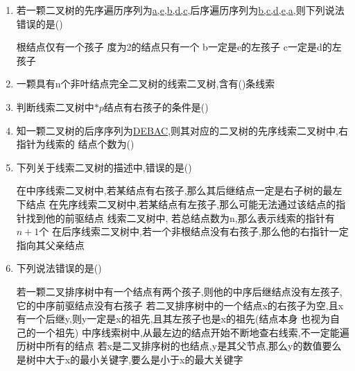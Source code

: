 \documentclass[12pt, a4paper, oneside, UTF8]{ctexbook}
\begin{document}
\begin{enumerate}
    \item 若一颗二叉树的先序遍历序列为\underline{a,e,b,d,c},后序遍历序列为\underline{b,c,d,e,a},则下列说法错误的是(\qquad)
    \begin{choices}[2]
        \task 根结点仅有一个孩子
        \task 度为2的结点只有一个
        \task b一定是e的左孩子
        \task c一定是d的左孩子
    \end{choices}
    \item 一颗具有n个非叶结点完全二叉树的线索二叉树,含有(\qquad)条线索
    \item 判断线索二叉树中$*p$结点有右孩子的条件是(\qquad\qquad)
    \item 知一颗二叉树的后序序列为\underline{DEBAC},则其对应的二叉树的先序线索二叉树中,右指针为线索的
    结点个数为(\qquad)
    \item 下列关于线索二叉树的描述中,错误的是(\qquad)
    \begin{choices}[1]
        \task 在中序线索二叉树中,若某结点有右孩子,那么其后继结点一定是右子树的最左下结点
        \task 在先序线索二叉树中,若某结点有左孩子,那么可能无法通过该结点的指针找到他的前驱结点
        \task 线索二叉树中, 若总结点数为n,那么表示线索的指针有$n+1$个
        \task 在后序线索二叉树中,若一个非根结点没有右孩子,那么他的右指针一定指向其父亲结点
    \end{choices}
    
    \item 下列说法错误的是(\qquad)
    \begin{choices}[1]
        \task 若一颗二叉排序树中有一个结点有两个孩子,则他的中序后继结点没有左孩子,它的中序前驱结点没有右孩子
        \task 若二叉排序树中的一个结点x的右孩子为空,且x有一个后继y,则y一定是x的祖先,且其左孩子也是x的祖先(结点本身
        也视为自己的一个祖先)
        \task 中序线索树中,从最左边的结点开始不断地查右线索,不一定能遍历树中所有的结点
        \task 若x是二叉排序树的也结点,y是其父节点,那么y的数值要么是树中大于x的最小关键字,要么是小于x的最大关键字
    \end{choices}


\end{enumerate}
\end{document}
